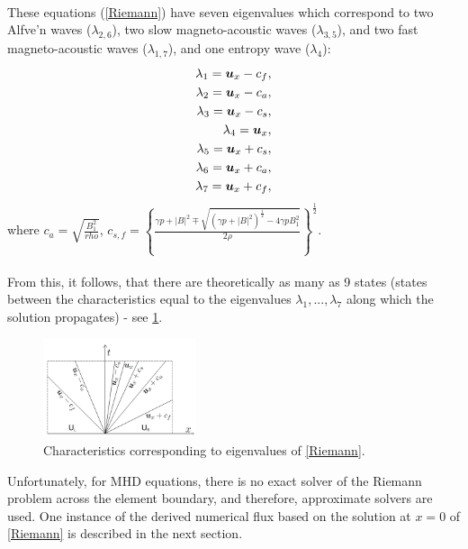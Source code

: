 \paragraph{}
These equations (\cref{Riemann}) have seven eigenvalues which correspond to two Alfve'n waves ($\lambda_{2, 6}$), two slow magneto-acoustic waves ($\lambda_{3, 5}$), and two fast magneto-acoustic waves ($\lambda_{1, 7}$), and one entropy wave ($\lambda_{4}$):
\begin{align}
\lambda_{1} = \mbox{\boldmath $u$}_x - c_f,\\
\lambda_{2} = \mbox{\boldmath $u$}_x - c_a,\\
\lambda_{3} = \mbox{\boldmath $u$}_x - c_s,\\
\lambda_{4} = \mbox{\boldmath $u$}_x,\\
\lambda_{5} = \mbox{\boldmath $u$}_x + c_s,\\
\lambda_{6} = \mbox{\boldmath $u$}_x + c_a,\\
\lambda_{7} = \mbox{\boldmath $u$}_x + c_f,
\end{align}
where $c_a = \sqrt{\frac{B_1^2}{rho}}$, $c_{s, f} = \left\{\frac{\gamma p + |B|^2 \mp \sqrt{\left(\gamma p + |B|^2\right)^{\frac12} - 4\gamma p B_1^2}}{2\rho}\right\}^{\frac12}$.
\paragraph{}
From this, it follows, that there are theoretically as many as 9 states (states between the characteristics equal to the eigenvalues $\lambda_1, ..., \lambda_7$ along which the solution propagates) - see \cref{figure:allRiemannStates}.

\begin{figure}[H]
	\centering
		\includegraphics[width=0.4\textwidth]{img/riemann/allStates.jpg}
		\vspace{-3mm}
	\caption{Characteristics corresponding to eigenvalues of \cref{Riemann}.}
	\label{figure:allRiemannStates}
\end{figure}

Unfortunately, for MHD equations, there is no exact solver of the Riemann problem across the element boundary, and therefore, approximate solvers are used. One instance of the derived numerical flux based on the solution at $x = 0$ of \cref{Riemann} is described in the next section.

